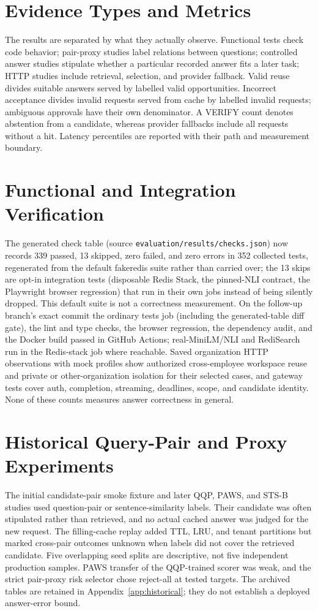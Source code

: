 \section{Evidence Types and Metrics}
The results are separated by what they actually observe. Functional tests check code behavior; pair-proxy studies label relations between questions; controlled answer studies stipulate whether a particular recorded answer fits a later task; HTTP studies include retrieval, selection, and provider fallback. Valid reuse divides suitable answers served by labelled valid opportunities. Incorrect acceptance divides invalid requests served from cache by labelled invalid requests; ambiguous approvals have their own denominator. A VERIFY count denotes abstention from a candidate, whereas provider fallbacks include all requests without a hit. Latency percentiles are reported with their path and measurement boundary.

\section{Functional and Integration Verification}
The generated check table (source \texttt{evaluation/results/checks.json}) now records 339 passed, 13 skipped, zero failed, and zero errors in 352 collected tests, regenerated from the default fakeredis suite rather than carried over; the 13 skips are opt-in integration tests (disposable Redis Stack, the pinned-NLI contract, the Playwright browser regression) that run in their own jobs instead of being silently dropped. This default suite is not a correctness measurement. On the follow-up branch's exact commit the ordinary tests job (including the generated-table diff gate), the lint and type checks, the browser regression, the dependency audit, and the Docker build passed in GitHub Actions; real-MiniLM/NLI and RediSearch run in the Redis-stack job where reachable. Saved organization HTTP observations with mock profiles show authorized cross-employee workspace reuse and private or other-organization isolation for their selected cases, and gateway tests cover auth, completion, streaming, deadlines, scope, and candidate identity. None of these counts measures answer correctness in general.

\section{Historical Query-Pair and Proxy Experiments}
The initial candidate-pair smoke fixture and later QQP, PAWS, and STS-B studies used question-pair or sentence-similarity labels. Their candidate was often stipulated rather than retrieved, and no actual cached answer was judged for the new request. The filling-cache replay added TTL, LRU, and tenant partitions but marked cross-pair outcomes unknown when labels did not cover the retrieved candidate. Five overlapping seed splits are descriptive, not five independent production samples. PAWS transfer of the QQP-trained scorer was weak, and the strict pair-proxy risk selector chose reject-all at tested targets. The archived tables are retained in Appendix~\ref{app:historical}; they do not establish a deployed answer-error bound.

